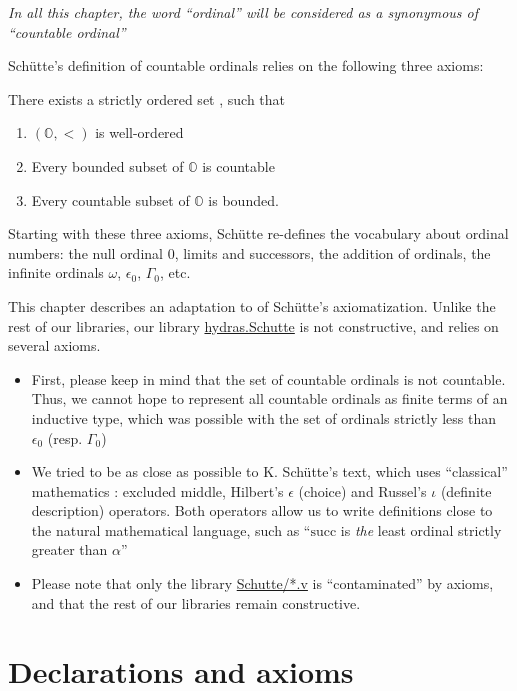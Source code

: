 \begin{remark}
\emph{In all this chapter, the word ``ordinal'' will be considered as a synonymous of
``countable ordinal''}  
\end{remark}



Schütte's definition of countable ordinals relies on the following three axioms:

There  exists a strictly ordered set , such that
\begin{enumerate}
\item  $(\mathbb{O},<)$ is well-ordered
\item Every bounded subset of $\mathbb{O}$  is countable
\item Every countable subset of $\mathbb{O}$  is bounded.
\end{enumerate}

Starting with these three axioms, Schütte re-defines the vocabulary about ordinal numbers: the null ordinal $0$, limits and successors, the addition of ordinals, the infinite ordinals $\omega$, $\epsilon_0$, $\Gamma_0$, etc.

This chapter describes an adaptation to \coq{} of Schütte's axiomatization. 
 Unlike the rest of our libraries, our library
\href{../theories/html/hydras.Schutte.Schutte.html}{hydras.Schutte}
is not constructive, and relies on several axioms.

\begin{itemize}
\item First, please keep in mind  that the set of countable ordinals is not countable. Thus, we cannot hope to represent all countable ordinals as finite terms of an inductive type, which was possible with  the set of ordinals strictly less than $\epsilon_0$ (resp. $\Gamma_0$)
\item We tried to be as close as possible to K. Schütte's text, which uses ``classical'' mathematics : excluded middle, Hilbert's $\epsilon$ (choice) and Russel's $\iota$ (definite description) operators. Both operators allow us to write definitions close to the natural mathematical language, such as ``$\textrm{succ}$ is \emph{the} least ordinal strictly greater than $\alpha$''
\item Please note that only the library \href{../theories/html/hydras.Schutte.Schutte.html}{Schutte/*.v} is ``contaminated'' by axioms, and that the rest of our libraries remain constructive.
\end{itemize}

\section{Declarations and axioms}

